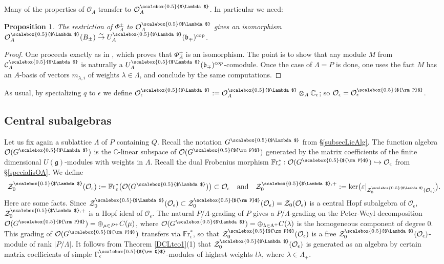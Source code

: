 \documentclass[11pt]{amsart}
\newtheorem{prop}[teo]{Proposition}
\newcommand{\e}{\epsilon}
\newcommand{\mc}{\mathbb{C}}
\newcommand{\Oo}{\mathcal{O}}
\newcommand{\Q}{{\scalebox{0.5}{${\rm Q}$}}}
\newcommand{\Pup}{{\scalebox{0.5}{${\rm P}$}}}
\newcommand{\Lam}{{\scalebox{0.5}{$\Lambda$}}}
\begin{document}
 Many of the properties of $\Oo_A$ transfer to $\Oo_A^\Lam$. In particular we need:
\begin{prop}\label{PhirresLam} The restriction of $\Phi_A^\pm$ to $\Oo_A^\Lam$ gives an isomorphism $\Oo_A^\Lam(B_\pm) \overset{\sim}{\to} U_A^\Lam(\mathfrak{b}_\mp)^{\mathrm{cop}}$.
\end{prop}
\begin{proof} One proceeds exactly as in \cite[Prop.\,4.2]{DC-L}, which proves that $\Phi_A^\pm$ is an isomorphism. The point is to show that any module $M$ from ${\mathcal C}^\Lam_A$ is naturally a $U_A^\Lam(\mathfrak{b}_\mp)^{cop}$-comodule. Once the case of $\Lambda=P$ is done, one uses the fact $M$ has an $A$-basis of vectors $m_{\lambda,i}$ of weights $\lambda\in \Lambda$, and conclude by the same computations. \end{proof}
\medskip

As usual, by specializing $q$ to $\e$ we define $\Oo_\e^\Lam := \Oo_A^\Lam\otimes_A \mc_\e$; so $\Oo_\e= \Oo_\e^\Pup$.

\subsection{Central subalgebras}\label{sec:centsubalg} Let us fix again a sublattice $\Lambda$ of $P$ containing $Q$. Recall the notation $G^\Lam$ from \S\ref{subsecLieAlg}. The function algebra $\mathcal{O}(G^\Lam)$ is the $\mc$-linear subspace of $\mathcal{O}(G^\Pup)$ generated by the matrix coefficients of the finite dimensional $U(\mathfrak{g})$-modules with weights in $\Lambda$. Recall the dual Frobenius morphism $\mathbb{F}\mathrm{r}_\e^* : \mathcal{O}(G^\Pup) \hookrightarrow \mathcal{O}_\e$ from \S\ref{specialisOA}. We define 
\begin{equation}\label{LambdaZmai25}
 {\mathcal Z}_0^\Lam({\mathcal O}_\e) := \mathbb{F}\mathrm{r}_\e^{*}\bigl( \mathcal{O}(G^\Lam) \bigr) \subset \mathcal{O}_\e \quad \text{and} \quad \mathcal{Z}_0^{\Lam,+} := \ker\bigl(\varepsilon\vert_{\mathcal{Z}_0^\Lam(\Oo_\e)} \bigr).
 \end{equation}
Here are some facts. Since ${\mathcal Z}_0^\Lam({\mathcal O}_\e)\subset {\mathcal Z}_0^\Pup ({\mathcal O}_\e) = {\mathcal Z}_0({\mathcal O}_\e)$ is a central Hopf subalgebra of $\Oo_\e$, $\mathcal{Z}_0^{\Lam,+}$ is a Hopf ideal of $\Oo_\e$. The natural $P/\Lambda$-grading of $P$ gives a $P/\Lambda$-grading on the Peter-Weyl decomposition $\Oo(G^\Pup)=\textstyle \oplus_{\mu\in P^+} C(\mu)$, where $\mathcal{O}(G^\Lam)=\textstyle \oplus_{\lambda\in \Lambda^+} C(\lambda)$ is the homogeneous component of degree $0$. This grading of $\Oo(G^\Pup)$ transfers via $\mathbb{F}\mathrm{r}_\e^{*}$, so that $\mathcal{Z}_0^\Pup({\mathcal O}_\e)$ is a free $\mathcal{Z}_0^\Lam(\mathcal{O}_\e)$-module of rank $\vert P/\Lambda \vert$. It follows from Theorem \ref{DCLteo1}(1) that $\mathcal{Z}_0^\Lam({\mathcal O}_\e)$ is generated as an algebra by certain matrix coefficients of simple $\Gamma_\e^\Q$-modules of highest weights $l\lambda$, where $\lambda\in \Lambda_+$.
\end{document}
